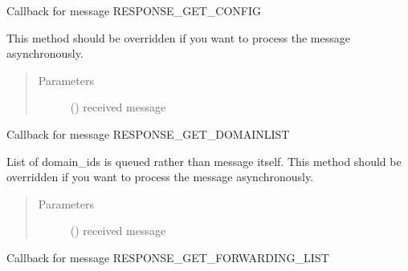 \documentclass[letterpaper,10pt,english]{sphinxmanual}
\begin{document}
\begin{fulllineitems}
\begin{fulllineitems}
\label{\detokenize{bbc1.core.bbc_app:bbc1.core.bbc_app.Callback.proc_resp_get_config}}
Callback for message RESPONSE\_GET\_CONFIG

This method should be overridden if you want to process the message asynchronously.
\begin{quote}\begin{description}
\item[{Parameters}] \leavevmode
{} () \textendash{} received message

\end{description}\end{quote}

\end{fulllineitems}


\begin{fulllineitems}
\label{\detokenize{bbc1.core.bbc_app:bbc1.core.bbc_app.Callback.proc_resp_get_domainlist}}
Callback for message RESPONSE\_GET\_DOMAINLIST

List of domain\_ids is queued rather than message itself.
This method should be overridden if you want to process the message asynchronously.
\begin{quote}\begin{description}
\item[{Parameters}] \leavevmode
{} () \textendash{} received message

\end{description}\end{quote}

\end{fulllineitems}


\begin{fulllineitems}
\label{\detokenize{bbc1.core.bbc_app:bbc1.core.bbc_app.Callback.proc_resp_get_forwardinglist}}
Callback for message RESPONSE\_GET\_FORWARDING\_LIST


\end{fulllineitems}
\end{fulllineitems}
\end{document}
